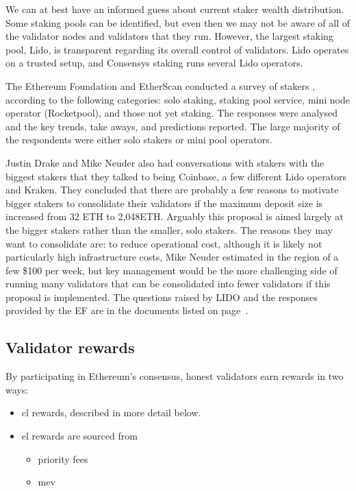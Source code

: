 \documentclass[UTF8]{article}
\begin{document}
We can at best have an informed guess about current staker wealth distribution. Some staking pools can be identified, but even then we may not be aware of all of the validator nodes and validators that they run. However, the largest staking pool, Lido, is transparent regarding its overall control of validators. Lido operates on a trusted setup, and Consensys staking runs several Lido operators. 



The Ethereum Foundation and EtherScan conducted a survey of stakers \cite{Smith2023}, according to the following categories: solo staking, staking pool service, mini node operator (Rocketpool), and those not yet staking. The responses were analysed and the key trends, take aways, and predictions reported. The large majority of the respondents were either solo stakers or mini pool operators.

Justin Drake and Mike Neuder also had conversations with stakers with the biggest stakers that they talked to being Coinbase, a few different Lido operators and Kraken. They concluded that there are probably a few reasons to motivate bigger stakers to consolidate their validators if the maximum deposit size is increased from 32 ETH to 2,048ETH. Arguably this proposal is aimed largely at the bigger stakers rather than the smaller, solo stakers. The reasons they may want to consolidate are: to reduce operational cost, although it is likely not particularly high infrastructure costs, Mike Neuder estimated in the region of a few \$100 per week, but key management would be the more challenging side of running many validators that can be consolidated into fewer validators if this proposal is implemented. The questions raised by LIDO and the responses provided by the EF are in the documents listed on page~\pageref{eip7251}.

\subsection{Validator rewards}
\label{rewards}

By participating in Ethereum’s consensus, honest validators earn rewards in two ways\cite{breslina}:
\begin{itemize}
\item \gls{cl} rewards, described in more detail below.
\item \gls{el} rewards are sourced from
	\begin{itemize}
	\item priority fees
	\item \gls{mev}
	\end{itemize}

\end{itemize}
\end{document}

